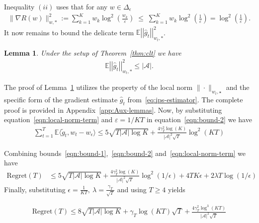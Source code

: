 \documentclass[11pt,letterpaper]{article}
\newcommand{\Exs}{\mathbb{E}}
\newcommand{\ghat}{\widehat{g}}
\newcommand{\grad}{\nabla}
\newcommand{\weps}{w_{\epsilon}}
\newcommand{\deleps}{\Delta_{\epsilon}}
\newcommand{\regT}{\mathrm{Regret}(T)}
\newcommand{\numactions}{|\mathcal{A}|}
\theoremstyle{plain}
\newtheorem{lemma}{Lemma}
\theoremstyle{definition}  %
\begin{document}
\noindent Inequality $(ii)$ uses that for any $w \in \deleps$
%
\begin{align*}
    \|\grad R(w)\|^2_{w, *} := \sum_{k=1}^K w_k \log^2\!\left(\frac{w_k}{\varepsilon}\right)
  \;\le\;
  \sum_{k=1}^K w_k \log^2\!\left(\frac{1}{\varepsilon}\right)
  = \log^2\!\left(\frac{1}{\varepsilon}\right). 
\end{align*}
%
It now remains to bound the delicate term $\Exs \left|\left|\widehat{g}_t\right|\right|_{w_t,\ast}^2$. 
\begin{lemma}\label{lemma:norm-ghat}
   Under the setup of Theorem~\ref{thm:clt} we have
   \begin{align}
\label{eqn:local-norm-term}
    \Exs \left|\left|\widehat{g}_t\right|\right|_{w_t,\ast}^2 \leq \numactions.
\end{align}
\end{lemma}
%
\noindent The proof of Lemma~\ref{lemma:norm-ghat} utilizes the property of the local norm $\|\cdot \|_{w_t, \star}$ and the specific form of the gradient estimate $\ghat_t$ from~\eqref{eq:ips-estimator}. The complete proof is provided in Appendix~\ref{app:Aux-lemmas}. Now,  
by substituting equation~\eqref{eqn:local-norm-term} and $\varepsilon = 1/KT$ in equation~\eqref{eqn:bound-2} we have
\begin{align*}
   \sum_{t=1}^T \Exs\langle \tilde{g}_t , w_t - \weps \rangle
   \leq 5\sqrt{T\numactions \log K} +
     \frac{4\gamma^2_T \log(K) }{ \numactions^2 \sqrt{T}}  \log^2\left( KT \right)
\end{align*}



\noindent Combining bounds~\eqref{eqn:bound-1},~\eqref{eqn:bound-2} and~\eqref{eqn:local-norm-term} we have 
%
\begin{align*}
    \regT &\leq 5\sqrt{T\numactions \log K} + \frac{4\gamma^2_T \log(K) }{ \numactions^2 \sqrt{T}}  \log^2\left( 1/\epsilon \right)
      +   4T K \epsilon + 2\lambda T \log(1/\epsilon) 
\end{align*}
Finally, substituting $\epsilon = \frac{1}{KT}, \ \lambda = \frac{\gamma_T}{\sqrt{T}}$ and using $T \geq 4$ yields 
%


\begin{align*}
    \regT \leq 8\sqrt{T\numactions \log K} + \gamma_T \log(KT) \sqrt{T}
    + \frac{4\gamma^2_T \log^3(KT) }{ \numactions^2 \sqrt{T}} 
\end{align*}


  
\end{document}
